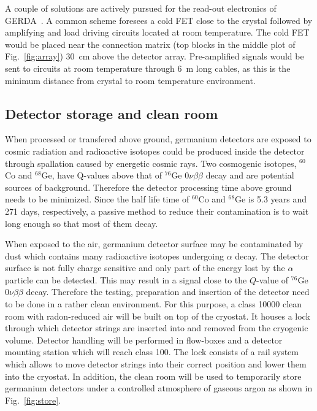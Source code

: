 A couple of solutions are actively pursued for the read-out electronics of GERDA~\cite{Cat07}. A common scheme foresees a cold FET close to the crystal followed by amplifying and load driving circuits located at room temperature. The cold FET would be placed near the connection matrix (top blocks in the middle plot of Fig.~\ref{fig:array}) 30~cm above the detector array. Pre-amplified signals would be sent to circuits at room temperature through 6~m long cables, as this is the minimum distance from crystal to room temperature environment.

\subsection{Detector storage and clean room}
\label{sec:gerda:source}
When processed or transfered above ground, germanium detectors are exposed to cosmic radiation and radioactive isotopes could be produced inside the detector through spallation caused by energetic cosmic rays. Two cosmogenic isotopes, $^{60}$Co and $^{68}$Ge, have Q-values above that of $^{76}$Ge $0\nu\beta\beta$ decay and are potential sources of background. Therefore the detector processing time above ground needs to be minimized. Since the half life time of $^{60}$Co and $^{68}$Ge is 5.3 years and 271 days, respectively, a passive method to reduce their contamination is to wait long enough so that most of them decay.

When exposed to the air, germanium detector surface may be contaminated by dust which contains many radioactive isotopes undergoing $\alpha$ decay. The detector surface is not fully charge sensitive and only part of the energy lost by the $\alpha$ particle can be detected. This may result in a signal close to the $Q$-value of $^{76}$Ge $0\nu\beta\beta$ decay. Therefore the testing, preparation and insertion of the detector need to be done in a rather clean environment. For this purpose, a class 10000 clean room with radon-reduced air will be built on top of the cryostat. It houses a lock through which detector strings are inserted into and removed from the cryogenic volume. Detector handling will be performed in flow-boxes and a detector mounting station which will reach class 100.  The lock consists of a rail system which allows to move detector strings into their correct position and lower them into the cryostat. In addition, the clean room will be used to temporarily store germanium detectors under a controlled atmosphere of gaseous argon as shown in Fig.~\ref{fig:store}.

